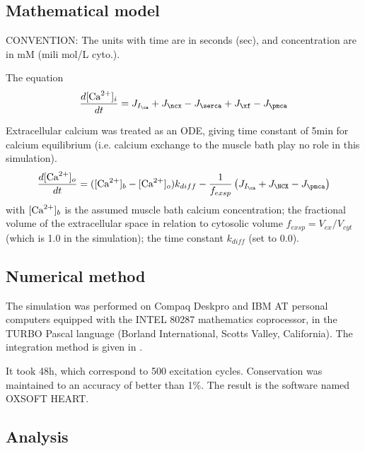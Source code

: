 
\subsection{Mathematical model}

CONVENTION: The units with time are in seconds (sec), and concentration are
in mM (mili mol/L cyto.).

The equation
\begin{equation}
\frac{d[\Ca]_i}{dt} = J_{I_\ca} + J_\ncx - J_\serca + J_\xf - J_\pmca
\end{equation}

Extracellular calcium was treated as an ODE, giving time constant of 5min for
calcium equilibrium (i.e. calcium exchange to the muscle bath play no role in
this simulation).
\begin{equation}
\frac{d[\Ca]_o}{dt} = ([\Ca]_b - [\Ca]_o) k_{diff} -
\frac{1}{f_{exsp}}\left(J_{I_\ca} + J_\NCX - J_\pmca\right)
\end{equation}
with $[{\text{Ca}^{2+}}]_b$ is the assumed muscle bath calcium concentration; the fractional
volume of the extracellular space in relation to cytosolic volume
$f_{exsp}=V_{ex}/V_{cyt}$ (which is 1.0 in the simulation); the time constant
$k_{diff}$ (set to 0.0).

\subsection{Numerical method}
\label{sec:numerical-analysis-5}

The simulation was performed on Compaq Deskpro and IBM AT personal
computers equipped with the INTEL 80287 mathematics coprocessor, in
the TURBO Pascal language (Borland International, Scotts Valley,
California). The integration method is given in \citep{difrancesco1985mcea}.  

It took 48h, which correspond to 500 excitation cycles. Conservation was
maintained to an accuracy of better than 1\%. The result is the software named
OXSOFT HEART.

\subsection{Analysis}

